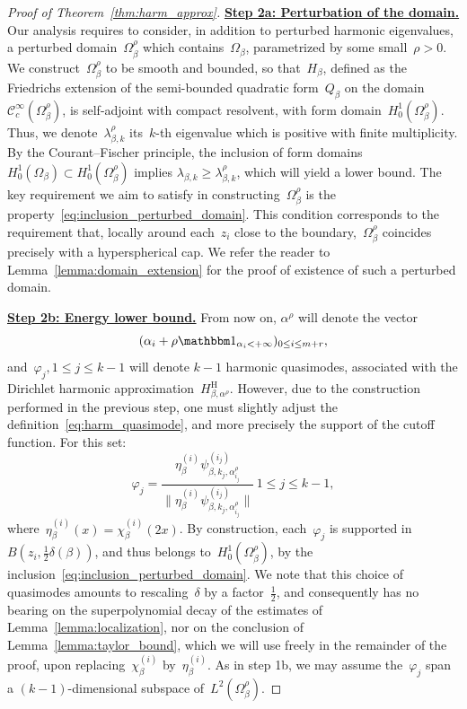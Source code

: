 \documentclass[10pt]{article}
\newcommand{\1}{\mathbbm 1}
\newcommand{\largeRadius}{\delta}
\newcommand{\shift}{\rho} %
\begin{document}
\begin{proof}[Proof of Theorem~\ref{thm:harm_approx}]
        {\underline{\bf Step 2a: Perturbation of the domain.}\newline}
        Our analysis requires to consider, in addition to perturbed harmonic eigenvalues, a perturbed domain~$\Omega_\beta^\shift$ which contains~$\Omega_\beta$, parametrized by some small~$\shift>0$.
        We construct~$\Omega_\beta^\shift$ to be smooth and bounded, so that~$H_\beta$, defined as the Friedrichs extension of the semi-bounded quadratic form~$Q_\beta$ on the domain~$\mathcal C_c^\infty( \Omega_\beta^\shift)$, is self-adjoint with compact resolvent, with form domain~$H_0^1(\Omega_\beta^\shift)$.
        Thus, we denote~$\lambda^\shift_{\beta,k}$ its~$k$-th eigenvalue which is positive with finite multiplicity.
        By the Courant--Fischer principle, the inclusion of form domains
        $H_0^1(\Omega_\beta) \subset H_0^1(\Omega_\beta^\shift)$
        implies $\lambda_{\beta,k}\geq \lambda^\shift_{\beta,k}$, which will yield a lower bound.
        The key requirement we aim to satisfy in constructing~$\Omega_\beta^\shift$ is the property~\eqref{eq:inclusion_perturbed_domain}.
        This condition corresponds to the requirement that, locally around each~$z_i$ close to the boundary,~$\Omega_\beta^\shift$ coincides precisely with a hyperspherical cap.
        We refer the reader to Lemma~\ref{lemma:domain_extension} for the proof of existence of such a perturbed domain.

        {\underline{\bf Step 2b: Energy lower bound.}\newline}
        From now on, $\alpha^\shift$ will denote the vector
        $$(\alpha_i+\shift\1_{\alpha_i<+\infty})_{0\leq i\leq m+r},$$
         and~$\varphi_{j}, 1\leq j \leq k-1$ will denote $k-1$ harmonic quasimodes, associated with the Dirichlet harmonic approximation~$H^{\mathrm{H}}_{\beta,\alpha^\shift}$.
        However, due to the construction performed in the previous step, one must slightly adjust the definition~\eqref{eq:harm_quasimode}, and more precisely the support of the cutoff function.
        For this set:
        \[\varphi_j = \frac{\eta_\beta^{(i)}\psi_{\beta,k_j,\alpha^\shift_{i_j}}^{(i_j)}}{\|\eta_\beta^{(i)}\psi_{\beta,k_j,\alpha^\shift_{i_j}}^{(i_j)}\|}\,1\leq j\leq k-1,\]
        where~$\eta_\beta^{(i)}(x) = \chi_\beta^{(i)}(2x)$.
        By construction, each~$\varphi_j$ is supported in~$B(z_i,\frac12\largeRadius(\beta))$, and thus belongs to~$H_0^1(\Omega_\beta^\shift)$, by the inclusion~\eqref{eq:inclusion_perturbed_domain}.
        We note that this choice of quasimodes amounts to rescaling~$\largeRadius$ by a factor~$\frac12$, and consequently has no bearing on the superpolynomial decay of the estimates of Lemma~\ref{lemma:localization}, nor on the conclusion of Lemma~\ref{lemma:taylor_bound}, which we will use freely in the remainder of the proof, upon replacing~$\chi_\beta^{(i)}$ by~$\eta_\beta^{(i)}$.
        As in step 1b, we may assume the~$\varphi_j$ span a $(k-1)$-dimensional subspace of~$L^2(\Omega_\beta^\shift)$.
      

\end{proof}
\end{document}
